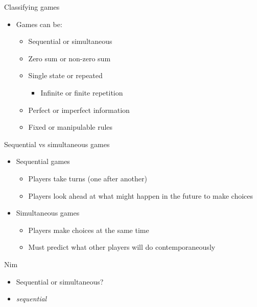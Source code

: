 \documentclass[10pt]{beamer}
\begin{document}
\begin{frame}[label={sec:org400a9d2}]{}
\alert{Classifying games}
\begin{itemize}
\item Games can be:
\begin{itemize}
\item Sequential or simultaneous
\item Zero sum or non-zero sum
\item Single state or repeated
\begin{itemize}
\item Infinite or finite repetition
\end{itemize}
\item Perfect or imperfect information
\item Fixed or manipulable rules
\end{itemize}
\end{itemize}
\end{frame}

\begin{frame}[label={sec:org8ce3f9f}]{}
\alert{Sequential vs simultaneous games}
\begin{itemize}
\item Sequential games
\begin{itemize}
\item Players take turns (one after another)
\item Players look ahead at what might happen in the future to make choices
\end{itemize}
\item Simultaneous games
\begin{itemize}
\item Players make choices at the same time
\item Must predict what other players will do contemporaneously
\end{itemize}
\end{itemize}
\end{frame}

\begin{frame}[label={sec:orgf0c9512}]{}
\alert{Nim}
\begin{itemize}
\item Sequential or simultaneous?
\end{itemize}
\begin{itemize}
\item \emph{sequential}
\end{itemize}
\end{frame}
\end{document}
